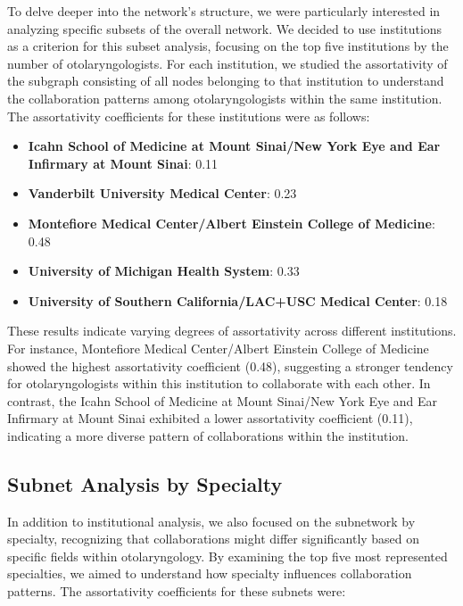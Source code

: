 \documentclass[12pt]{article}
\begin{document}
To delve deeper into the network’s structure, we were particularly interested in analyzing specific subsets of the overall network. We decided to use institutions as a criterion for this subset analysis, focusing on the top five institutions by the number of otolaryngologists. For each institution, we studied the assortativity of the subgraph consisting of all nodes belonging to that institution to understand the collaboration patterns among otolaryngologists within the same institution. The assortativity coefficients for these institutions were as follows:

\begin{itemize}
    \item \textbf{Icahn School of Medicine at Mount Sinai/New York Eye and Ear Infirmary at Mount Sinai}: 0.11
    \item \textbf{Vanderbilt University Medical Center}: 0.23
    \item \textbf{Montefiore Medical Center/Albert Einstein College of Medicine}: 0.48
    \item \textbf{University of Michigan Health System}: 0.33
    \item \textbf{University of Southern California/LAC+USC Medical Center}: 0.18
\end{itemize}

These results indicate varying degrees of assortativity across different institutions. For instance, Montefiore Medical Center/Albert Einstein College of Medicine showed the highest assortativity coefficient (0.48), suggesting a stronger tendency for otolaryngologists within this institution to collaborate with each other. In contrast, the Icahn School of Medicine at Mount Sinai/New York Eye and Ear Infirmary at Mount Sinai exhibited a lower assortativity coefficient (0.11), indicating a more diverse pattern of collaborations within the institution.

\subsection{Subnet Analysis by Specialty}

In addition to institutional analysis, we also focused on the subnetwork by specialty, recognizing that collaborations might differ significantly based on specific fields within otolaryngology. By examining the top five most represented specialties, we aimed to understand how specialty influences collaboration patterns. The assortativity coefficients for these subnets were:
\end{document}
